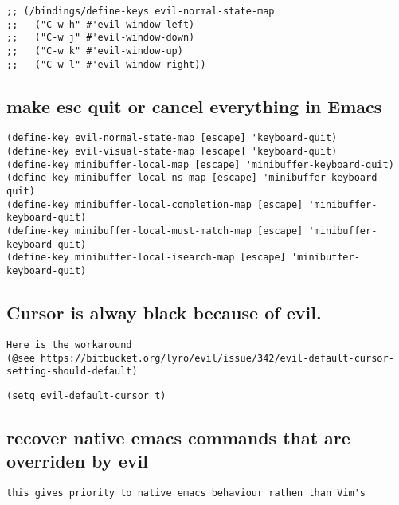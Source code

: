 \documentclass[11pt]{article}
\begin{document}
\begin{verbatim}
;; (/bindings/define-keys evil-normal-state-map
;;   ("C-w h" #'evil-window-left)
;;   ("C-w j" #'evil-window-down)
;;   ("C-w k" #'evil-window-up)
;;   ("C-w l" #'evil-window-right))
\end{verbatim}


\subsection*{make esc quit or cancel everything in Emacs}
\label{sec:orgcbfcd27}
\begin{verbatim}
(define-key evil-normal-state-map [escape] 'keyboard-quit)
(define-key evil-visual-state-map [escape] 'keyboard-quit)
(define-key minibuffer-local-map [escape] 'minibuffer-keyboard-quit)
(define-key minibuffer-local-ns-map [escape] 'minibuffer-keyboard-quit)
(define-key minibuffer-local-completion-map [escape] 'minibuffer-keyboard-quit)
(define-key minibuffer-local-must-match-map [escape] 'minibuffer-keyboard-quit)
(define-key minibuffer-local-isearch-map [escape] 'minibuffer-keyboard-quit)
\end{verbatim}

\subsection*{Cursor is alway black because of evil.}
\label{sec:orgb21f7a3}

\begin{verbatim}
Here is the workaround
(@see https://bitbucket.org/lyro/evil/issue/342/evil-default-cursor-setting-should-default)
\end{verbatim}

\begin{verbatim}
(setq evil-default-cursor t)
\end{verbatim}

\subsection*{recover native emacs commands that are overriden by evil}
\label{sec:orgad27a55}
\begin{verbatim}
this gives priority to native emacs behaviour rathen than Vim's
\end{verbatim}
\end{document}
